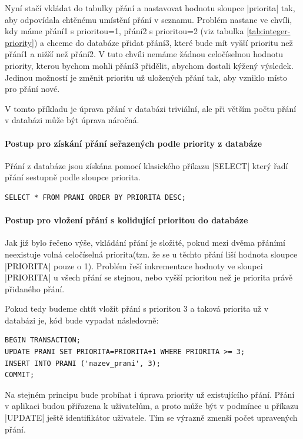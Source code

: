Nyní stačí vkládat do tabulky přání a nastavovat hodnotu sloupce |priorita| tak, aby odpovídala chtěnému umístění přání v seznamu. Problém nastane ve chvíli, kdy máme přání1 s prioritou=1, přání2 s prioritou=2 (viz tabulka \ref{tab:integer-priority}) a chceme do databáze přidat přání3, které bude mít vyšší prioritu než přání1 a nižší než přání2. V tuto chvíli nemáme žádnou celočíselnou hodnotu priority, kterou bychom mohli přání3 přidělit, abychom dostali kýžený výsledek. Jedinou možností je změnit prioritu už uložených přání tak, aby vzniklo místo pro přání nové.

V tomto příkladu je úprava přání v databázi triviální, ale při větším počtu přání v databázi může být úprava náročná.

\paragraph{Postup pro získání přání seřazených podle priority z databáze}
Přání z databáze jsou získána pomocí klasického příkazu |SELECT| který řadí přání sestupně podle sloupce priorita.

\lstset{language=SQL, style=custom} 
\begin{lstlisting}
SELECT * FROM PRANI ORDER BY PRIORITA DESC;
\end{lstlisting}

\paragraph{Postup pro vložení přání s kolidující prioritou do databáze}
Jak již bylo řečeno výše, vkládání přání je složité, pokud mezi dvěma přánímí neexistuje volná celočíselná priorita(tzn. že se u těchto přání liší hodnota sloupce |PRIORITA| pouze o 1). Problém řeší inkrementace hodnoty ve sloupci |PRIORITA| u všech přání se stejnou, nebo vyšší prioritou než je priorita právě přidaného přání.

Pokud tedy budeme chtít vložit přání s prioritou 3 a taková priorita už v databázi je, kód bude vypadat následovně:

\begin{lstlisting}
BEGIN TRANSACTION;
UPDATE PRANI SET PRIORITA=PRIORITA+1 WHERE PRIORITA >= 3;
INSERT INTO PRANI ('nazev_prani', 3);
COMMIT;
\end{lstlisting}

Na stejném principu bude probíhat i úprava priority už existujícího přání. Přání v aplikaci budou přiřazena k uživatelům, a proto může být v podmínce u příkazu |UPDATE| ještě identifikátor uživatele. Tím se výrazně zmenší počet upravených přání.

